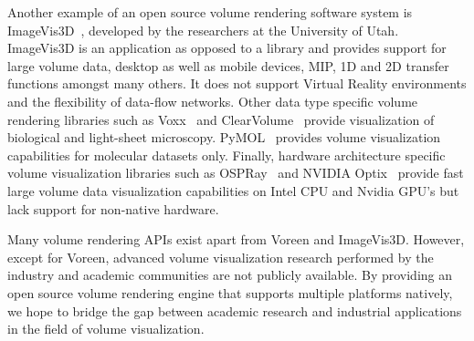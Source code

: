 Another example of an open source volume rendering software system is
ImageVis3D~\citep{cibc_imagevis3D:_2016}, developed by the researchers at the
University of Utah. ImageVis3D is an application as opposed to a library and
provides support for large volume data, desktop as well as mobile devices, MIP,
1D and 2D transfer functions amongst many others.  It does not support Virtual
Reality environments and the flexibility of data-flow networks. Other data
type specific volume rendering libraries such as
Voxx~\citep{clendenon_voxx:_2002} and
ClearVolume~\citep{royer_clearvolume:_2015} provide visualization of
biological and light-sheet microscopy.
PyMOL~\citep{schrodinger_llc_pymol_2015} provides volume visualization
capabilities for molecular datasets only. Finally, hardware architecture
specific volume visualization libraries such as
OSPRay~\citep{wald_ospray_2017} and NVIDIA\textsuperscript{\textregistered}
Optix\textsuperscript{\texttrademark}~\citep{parker_optix:_2010} provide fast
large volume data visualization capabilities on Intel CPU and Nvidia GPU's but
lack support for non-native hardware.

Many volume rendering APIs exist apart from Voreen and ImageVis3D. However,
except for Voreen, advanced volume visualization research performed by the
industry and academic communities are not publicly available. By providing an
open source volume rendering engine that supports multiple platforms natively,
we hope to bridge the gap between academic research and industrial applications
in the field of volume visualization.
